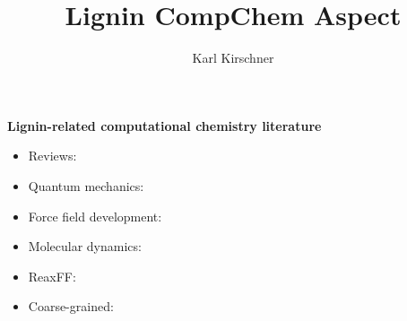\documentclass[10pt,a4paper]{article}
\author{Karl Kirschner}
\title{Lignin CompChem Aspect}
\begin{document}


\textbf{Lignin-related computational chemistry literature}
\begin{itemize}
    \item Reviews: \cite{PetridisPUHOFRS2011,SanghaPSZP2011,MurilloBNM2017,MurilloBNM2017,ZhangHLWHFALZ2019}
    
    \item Quantum mechanics: \cite{MardisGBPG1999,DurbeejE2003a, DurbeejE2003b, BesteB2009, ChenS2010, JarvisDCDSDRN2011, KimCNBFPB2011, RodrigoJZ2011, WattsMK2011, QinWZDY2014, HuangHLTWW2015, HuangH2015, ChenYLSLFWC2015, ElderF2016, JunjiaoJCTCW2016, Sanchez-GonzalezMD2017, ZhangHDFZ2017, GaniOASBBR2018}

    \item Force field development: \cite{PetridisS2009,VermaasPRCB2019}
    
    \item Molecular dynamics: \cite{BesombesM2005, LiE2005, BesombesM2005a, PetridisSS2011, CharlierM2012, Castilho-AlmeidaDD2013, LindnerPSS2013, LanganPOPFNSLHHHUEGRS2014, LiWXZ2014, VermaasPQSLS2015, PetridisS2016, JunjiaoJCTCW2016}

    \item ReaxFF: \cite{Beste2014}

    \item Coarse-grained: \cite{LiZHZZ2016}


\end{itemize}









\end{document}
